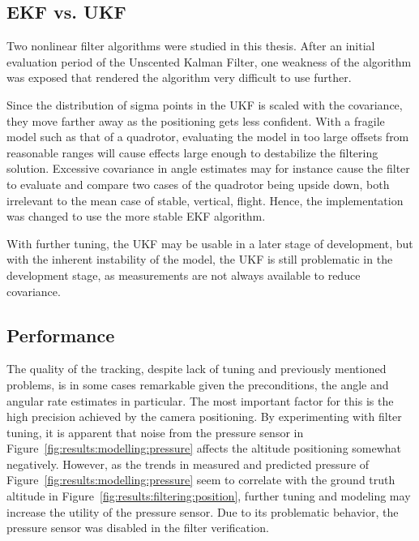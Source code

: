         \subsection{EKF vs. UKF}
            Two nonlinear filter algorithms were studied in this thesis.
            After an initial evaluation period of the Unscented Kalman Filter,
            one weakness of the algorithm was exposed that rendered the
            algorithm very difficult to use further.

            Since the distribution of sigma points in the UKF is scaled with
            the covariance, they move farther away as the positioning gets
            less confident.
            With a fragile model such as that of a quadrotor,
            evaluating the model in too large offsets from reasonable ranges
            will cause effects large enough to destabilize the filtering solution.
            Excessive covariance in angle estimates may for instance
            cause the filter to evaluate and compare two cases of the quadrotor
            being upside down, both irrelevant to the mean case of stable, vertical, flight.
            Hence, the implementation was changed to use the more stable EKF algorithm.

            With further tuning, the UKF may be usable in a later stage of development, but with the inherent
            instability of the model, the UKF is still problematic in
            the development stage, as measurements are not always
            available to reduce covariance.

        \subsection{Performance}
            The quality of the tracking, despite lack of tuning and previously
            mentioned problems, is in some cases remarkable given the
            preconditions, the angle and angular rate estimates in particular.
            The most important factor for this is the high precision achieved by the
            camera positioning. By experimenting with filter tuning, it
            is apparent that noise from the pressure sensor
            in Figure~\ref{fig:results:modelling:pressure} affects the altitude positioning
            somewhat negatively. However, as the trends in measured and predicted pressure of Figure~\ref{fig:results:modelling:pressure}
            seem to correlate with the ground truth altitude in Figure~\ref{fig:results:filtering:position},
            further tuning and modeling may increase the utility of the pressure sensor.
            Due to its problematic behavior, the pressure sensor was
            disabled in the filter verification.

